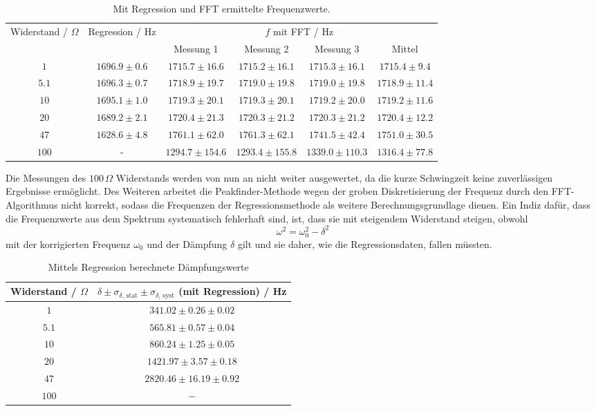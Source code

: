 \documentclass[a4paper, 12pt]{scrartcl}
\begin{document}
\begin{table}[H]
\centering
\begin{adjustbox}{width=\textwidth}
\begin{tabular}{c|c|cccc}
\multirow{2}{*}{Widerstand / $\Omega$} & \multirow{2}{*}{Regression / Hz} & \multicolumn{4}{c}{$f$ mit FFT / Hz} \\
\cline{3-6}
& & Messung 1 & Messung 2 & Messung 3 & Mittel\\
\hline
$1$ & $1696.9 \pm 0.6$ & $1715.7\pm 16.6$ & $1715.2\pm 16.1$ & $1715.3\pm 16.1$ & $1715.4\pm 9.4$\\
$5.1$ & $1696.3 \pm 0.7$ & $1718.9\pm 19.7$ & $1719.0\pm 19.8$ & $1719.0\pm 19.8$ & $1718.9\pm 11.4$\\
$10$ & $1695.1 \pm 1.0$ & $1719.3\pm 20.1$ & $1719.3\pm 20.1$ & $1719.2\pm 20.0$ & $1719.2\pm 11.6$ \\
$20$ & $1689.2 \pm 2.1$ & $1720.4\pm 21.3$ & $1720.3\pm 21.2$ & $1720.3\pm 21.2$ & $1720.4\pm 12.2$\\
$47$ & $1628.6 \pm 4.8$ & $1761.1\pm 62.0$ & $1761.3\pm 62.1$ & $1741.5\pm 42.4$ & $1751.0 \pm 30.5$\\
$100$ & - & $1294.7\pm 154.6$ & $1293.4\pm 155.8$ & $1339.0\pm 110.3$ & $1316.4 \pm 77.8$
\end{tabular}
\end{adjustbox}
\caption{Mit Regression und FFT ermittelte Frequenzwerte.}
\label{tab:freq}
\end{table}

Die Messungen des $100\,\Omega$ Widerstands werden von nun an nicht weiter ausgewertet, da die kurze Schwingzeit keine zuverlässigen Ergebnisse ermöglicht. Des Weiteren arbeitet die Peakfinder-Methode wegen der groben Diskretisierung der Frequenz durch den FFT-Algorithmus nicht korrekt, sodass die Frequenzen der Regressionsmethode als weitere Berechnungsgrundlage dienen. Ein Indiz dafür, dass die Frequenzwerte aus dem Spektrum systematisch fehlerhaft sind, ist, dass sie mit steigendem Widerstand steigen, obwohl
\begin{equation}\label{eq:korrektur}
\omega^2 = \omega_0^2 - \delta^2
\end{equation}
mit der korrigierten Frequenz $\omega_0$ und der Dämpfung $\delta$ gilt und sie daher, wie die Regressionsdaten, fallen müssten.

\begin{table}[h]
\centering
\begin{tabular}{c|c}
Widerstand / $\Omega$ & $\delta \pm \sigma_{\delta\text{, stat}} \pm \sigma_{\delta\text{, syst}}$ (mit Regression) / Hz \\
\hline
$1$ & $341.02 \pm 0.26 \pm 0.02$ \\
$5.1$ & $565.81 \pm 0.57 \pm 0.04$\\
$10$ & $860.24 \pm 1.25 \pm 0.05$ \\
$20$ & $1421.97 \pm 3.57 \pm 0.18$ \\
$47$ & $2820.46 \pm 16.19 \pm 0.92$\\
$100$ & $-$
\end{tabular}
\caption{Mittels Regression berechnete Dämpfungswerte}
\label{tab:daempfung1}
\end{table}
\end{document}
